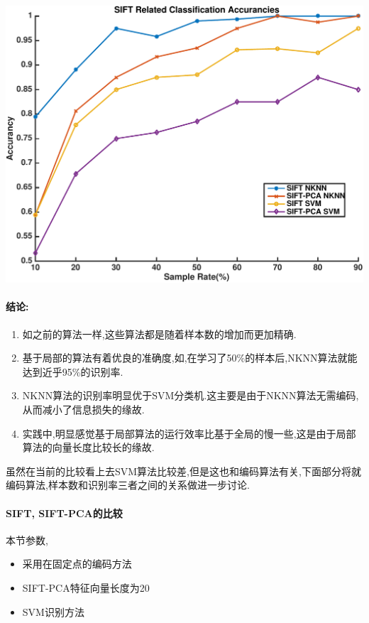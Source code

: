 		\begin{center}
		\begin{minipage}[t]{\linewidth}
		\center
		{
		\includegraphics[width=\textwidth]{Img/c3/sift_classification} 
		}
		\end{minipage}
		\medskip
		\end{center}
		
\paragraph{结论:}
\begin{enumerate}
	\item 如之前的算法一样,这些算法都是随着样本数的增加而更加精确.
	\item 基于局部的算法有着优良的准确度,如,在学习了50\%的样本后,NKNN算法就能达到近乎95\%的识别率.
	\item NKNN算法的识别率明显优于SVM分类机.这主要是由于NKNN算法无需编码,从而减小了信息损失的缘故.
	\item 实践中,明显感觉基于局部算法的运行效率比基于全局的慢一些,这是由于局部算法的向量长度比较长的缘故.
\end{enumerate}

虽然在当前的比较看上去SVM算法比较差,但是这也和编码算法有关,下面部分将就编码算法,样本数和识别率三者之间的关系做进一步讨论.

\paragraph{SIFT, SIFT-PCA的比较}本节参数,
\begin{itemize}
	\item 采用在固定点的编码方法
	\item SIFT-PCA特征向量长度为20
	\item SVM识别方法
\end{itemize}

